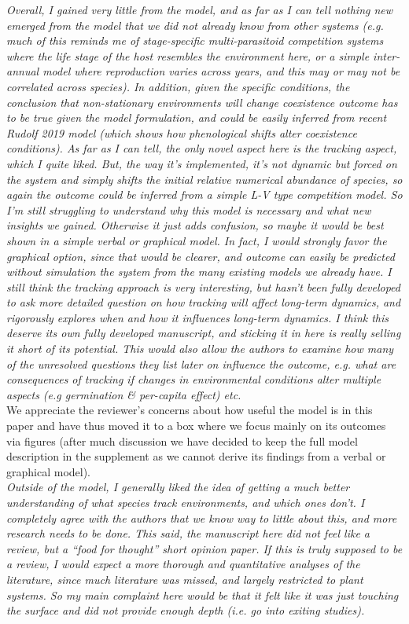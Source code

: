 \documentclass[11pt]{article}
\begin{document}
\emph{Overall, I gained very little from the model, and as far as I can tell nothing new emerged
from the model that we did not already know from other systems (e.g.  much of this reminds me
of stage-specific multi-parasitoid competition systems where the life stage of the host
resembles the environment here, or a simple inter-annual model where reproduction varies
across years, and this may or may not be correlated across species). In addition, given the
specific conditions, the conclusion that non-stationary environments will change coexistence
outcome has to be true given the model formulation, and could be easily inferred from recent
Rudolf 2019 model (which shows how phenological shifts alter coexistence conditions).
As far as I can tell, the only novel aspect here is the tracking aspect, which I quite liked.
But, the way it’s implemented, it’s not dynamic but forced on the system and simply shifts
the initial relative numerical abundance of species, so again the outcome could be inferred
from a simple L-V type competition model. So I’m still struggling to understand why this
model is necessary and what new insights we gained. Otherwise it just adds confusion, so
maybe it would be best shown in a simple verbal or graphical model. In fact, I would strongly
favor the graphical option, since that would be clearer, and outcome can easily be predicted
without simulation the system from the many existing models we already have. I still think
the tracking approach is very interesting, but hasn’t been fully developed to ask more
detailed question on how tracking will affect long-term dynamics, and rigorously explores
when and how it influences long-term dynamics. I think this deserve its own fully developed
manuscript, and sticking it in here is really selling it short of its potential. This would
also allow the authors to examine how many of the unresolved questions they list later on
influence the outcome, e.g. what are consequences of tracking if changes in environmental
conditions alter multiple aspects (e.g germination \& per-capita effect) etc.}\\

We appreciate the reviewer's concerns about how useful the model is in this paper and have thus moved it to a box where we focus mainly on its outcomes via figures (after much discussion we have decided to keep the full model description in the supplement as we cannot derive its findings from a verbal or graphical model).\\

\emph{Outside of the model, I generally liked the idea of getting a much better understanding of
what species track environments, and which ones don’t. I completely agree with the authors
that we know way to little about this, and more research needs to be done. This said, the
manuscript here did not feel like a review, but a ``food for thought'' short opinion paper. If
this is truly supposed to be a review, I would expect a more thorough and quantitative
analyses of the literature, since much literature was missed, and largely restricted to plant
systems.  So my main complaint here would be that it felt like it was just touching the
surface and did not provide enough depth (i.e. go into exiting studies).}\\
\end{document}
